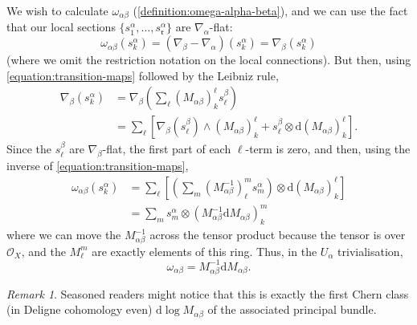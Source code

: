 \documentclass[11pt,fleqn]{article}
\theoremstyle{plain}
\theoremstyle{definition}
\theoremstyle{remark}
\newtheorem{remark}[theorem]{Remark}
\numberwithin{equation}{theorem}
\newcommand{\OO}{\mathcal{O}}
\renewcommand{\d}{\mathrm{d}}
\begin{document}
        We wish to calculate $\omega_{\alpha\beta}$ (\cref{definition:omega-alpha-beta}), and we can use the fact that our local sections $\{s_1^\alpha,\ldots,s_\mathfrak{r}^\alpha\}$ are $\nabla_\alpha$-flat:
        \[
            \omega_{\alpha\beta} \left(s_k^\alpha\right)
            =
            \left(\nabla_\beta-\nabla_\alpha\right) \left(s_k^\alpha\right)
            =
            \nabla_\beta \left(s_k^\alpha\right)
        \]
        (where we omit the restriction notation on the local connections).
        But then, using \cref{equation:transition-maps} followed by the Leibniz rule,
        \begin{align*}
            \nabla_\beta\left(s^\alpha_k\right) &= \nabla_\beta\left(\sum_\ell(M_{\alpha\beta})_k^\ell s^\beta_\ell\right)\\
            &=\sum_\ell\left[\nabla_\beta\left(s^\beta_\ell\right)\wedge(M_{\alpha\beta})^\ell_k+s^\beta_\ell\otimes\d(M_{\alpha\beta})^\ell_k\right].
        \end{align*}
        Since the $s^\beta_\ell$ are $\nabla_\beta$-flat, the first part of each $\ell$-term is zero, and then, using the inverse of \cref{equation:transition-maps},
        \begin{align*}
            \omega_{\alpha\beta}\left(s^\alpha_k\right) &= \sum_\ell\left[\left(\sum_m(M_{\alpha\beta}^{-1})^m_\ell s^\alpha_m\right)\otimes\d(M_{\alpha\beta})^\ell_k\right]\\
            &=\sum_m s^\alpha_m\otimes(M_{\alpha\beta}^{-1}\d M_{\alpha\beta})^m_k
        \end{align*}
        where we can move the $M_{\alpha\beta}^{-1}$ across the tensor product because the tensor is over $\OO_X$, and the $M_\ell^m$ are exactly elements of this ring.
        Thus, in the $U_\alpha$ trivialisation,
        \begin{equation}
        \label{equation:omega-alpha-beta-explicitly}
            \omega_{\alpha\beta}
            =
            M_{\alpha\beta}^{-1}\d M_{\alpha\beta}.
        \end{equation}

        \begin{remark}
            Seasoned readers might notice that this is exactly the first Chern class (in Deligne cohomology even) $\d\log M_{\alpha\beta}$ of the associated principal bundle.
        \end{remark}
\end{document}
